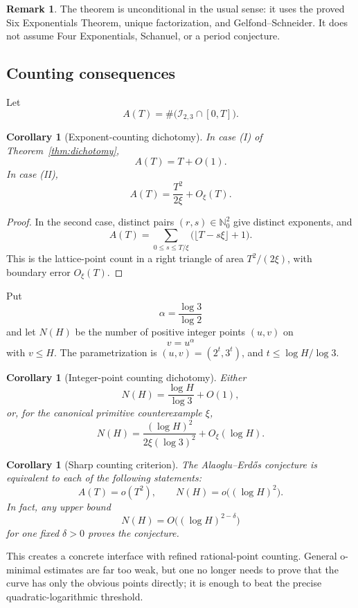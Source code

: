 \documentclass[11pt,oneside]{article}
\newtheorem{corollary}[theorem]{Corollary}
\theoremstyle{definition}
\newtheorem{remark}[theorem]{Remark}
\newcommand{\N}{\mathbb N}
\newcommand{\Ispace}{\mathscr I_{2,3}}
\begin{document}
\begin{remark}
The theorem is unconditional in the usual sense: it uses the proved Six Exponentials Theorem, unique factorization, and Gelfond--Schneider.  It does not assume Four Exponentials, Schanuel, or a period conjecture.
\end{remark}

\subsection{Counting consequences}

Let
\[
 A(T)=\#\bigl(\Ispace\cap[0,T]\bigr).
\]

\begin{corollary}[Exponent-counting dichotomy]
In case \textup{(I)} of Theorem~\ref{thm:dichotomy},
\[
  A(T)=T+O(1).
\]
In case \textup{(II)},
\[
  A(T)=\frac{T^2}{2\xi}+O_\xi(T).
\]
\end{corollary}

\begin{proof}
In the second case, distinct pairs $(r,s)\in\N_0^2$ give distinct exponents, and
\[
 A(T)=\sum_{0\le s\le T/\xi}
       \bigl(\lfloor T-s\xi\rfloor+1\bigr).
\]
This is the lattice-point count in a right triangle of area $T^2/(2\xi)$, with boundary error $O_\xi(T)$.
\end{proof}

Put
\[
  \alpha=\frac{\log3}{\log2}
\]
and let $N(H)$ be the number of positive integer points $(u,v)$ on
\[
  v=u^\alpha
\]
with $v\le H$.  The parametrization is $(u,v)=(2^t,3^t)$, and $t\le\log H/\log3$.

\begin{corollary}[Integer-point counting dichotomy]\label{cor:counting}
Either
\[
 N(H)=\frac{\log H}{\log3}+O(1),
\]
or, for the canonical primitive counterexample $\xi$,
\[
 N(H)=
 \frac{(\log H)^2}{2\xi(\log3)^2}
 +O_\xi(\log H).
\]
\end{corollary}

\begin{corollary}[Sharp counting criterion]
The Alaoglu--Erd\H{o}s conjecture is equivalent to each of the following statements:
\[
 A(T)=o(T^2),
 \qquad
 N(H)=o\bigl((\log H)^2\bigr).
\]
In fact, any upper bound
\[
 N(H)=O\bigl((\log H)^{2-\delta}\bigr)
\]
for one fixed $\delta>0$ proves the conjecture.
\end{corollary}

This creates a concrete interface with refined rational-point counting.  General o-minimal estimates are far too weak, but one no longer needs to prove that the curve has only the obvious points directly; it is enough to beat the precise quadratic-logarithmic threshold.
\end{document}
